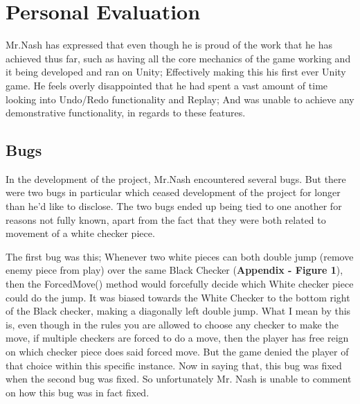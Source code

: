 \documentclass[10pt, a4paper]{article}
\begin{document}
	 \section{Personal Evaluation}
	 Mr.Nash has expressed that even though he is proud of the work that he has achieved thus far, such as having all the core mechanics of the game working and it being developed and ran on Unity; Effectively making this his first ever Unity game. He feels overly disappointed that he had spent a vast amount of time looking into Undo/Redo functionality and Replay; And was unable to achieve any demonstrative functionality, in regards to these features.
	 
	 \subsection{Bugs}
	 In the development of the project, Mr.Nash encountered several bugs. But there were two bugs in particular which ceased development of the project for longer than he'd like to disclose. The two bugs ended up being tied to one another for reasons not fully known, apart from the fact that they were both related to movement of a white checker piece. 
	 
	 The first bug was this; Whenever two white pieces can both double jump (remove enemy piece from play) over the same Black Checker (\textbf{Appendix - Figure 1}), then the ForcedMove() method would forcefully decide which White checker piece could do the jump. It was biased towards the White Checker to the bottom right of the Black checker, making a diagonally left double jump. What I mean by this is, even though in the rules you are allowed to choose any checker to make the move, if multiple checkers are forced to do a move, then the player has free reign on which checker piece does said forced move. But the game denied the player of that choice within this specific instance. Now in saying that, this bug was fixed when the second bug was fixed. So unfortunately Mr. Nash is unable to comment on how this bug was in fact fixed.
	 
\end{document}
